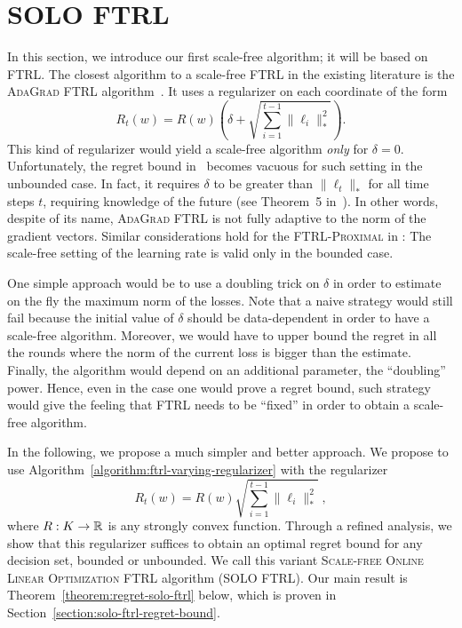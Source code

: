 \section{\textsc{SOLO FTRL}}
\label{section:solo-ftrl}

In this section, we introduce our first scale-free algorithm; it will be based
on \textsc{FTRL}. The closest algorithm to a scale-free \textsc{FTRL} in the
existing literature is the \textsc{AdaGrad FTRL}
algorithm~\cite{Duchi-Hazan-Singer-2011}. It uses a regularizer on each
coordinate of the form
\begin{equation*}
R_t(w) = R(w) \left(\delta + \sqrt{\sum_{i=1}^{t-1} \|\ell_i\|_*^2} \right).
\end{equation*}
This kind of regularizer would yield a scale-free algorithm \emph{only} for
$\delta=0$.  Unfortunately, the regret bound in~\cite{Duchi-Hazan-Singer-2011}
becomes vacuous for such setting in the unbounded case. In fact, it requires
$\delta$ to be greater than $\|\ell_t\|_*$ for all time steps $t$, requiring
knowledge of the future (see Theorem~5 in~\cite{Duchi-Hazan-Singer-2011}). In
other words, despite of its name, \textsc{AdaGrad FTRL} is not fully adaptive to
the norm of the gradient vectors. Similar considerations hold for the
\textsc{FTRL-Proximal} in \cite{McMahan-Streeter-2010,McMahan-2014}: The
scale-free setting of the learning rate is valid only in the bounded case.

One simple approach would be to use a doubling trick on $\delta$ in order to
estimate on the fly the maximum norm of the losses. Note that a naive strategy
would still fail because the initial value of $\delta$ should be data-dependent
in order to have a scale-free algorithm. Moreover, we would have to upper bound
the regret in all the rounds where the norm of the current loss is bigger than
the estimate. Finally, the algorithm would depend on an additional parameter,
the ``doubling'' power. Hence, even in the case one would prove a regret bound,
such strategy would give the feeling that \textsc{FTRL} needs to be ``fixed''
in order to obtain a scale-free algorithm.

In the following, we propose a much simpler and better approach.  We propose to
use Algorithm~\ref{algorithm:ftrl-varying-regularizer} with the regularizer
\begin{equation}
\label{equation:solo-ftrl-regularizer}
R_t(w) = R(w) \sqrt{\sum_{i=1}^{t-1} \|\ell_i\|_*^2} \; ,
\end{equation}
where $R:K \to \mathbb{R}$ is any strongly convex function. Through a refined analysis,
we show that this regularizer suffices to obtain an optimal regret bound for any
decision set, bounded or unbounded.  We call this variant \textsc{Scale-free
Online Linear Optimization FTRL} algorithm (\textsc{SOLO FTRL}).  Our main
result is Theorem~\ref{theorem:regret-solo-ftrl} below, which is proven in
Section~\ref{section:solo-ftrl-regret-bound}.

